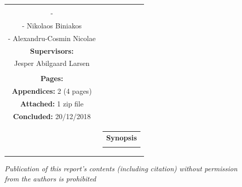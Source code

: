 \begin{nopagebreak}
{\begin{tabular}{cc}
{{\textbf{Participants:}\\
-  \\
- Nikolaos Biniakos\\
- Alexandru-Cosmin Nicolae\\

\textbf{Supervisors:}\\
Jesper Abilgaard Larsen \\ %
}\\


\textbf{Pages:} \\
\textbf{Appendices:} 2 (4 pages)\\
\textbf{Attached:} 1 zip file\\
\textbf{Concluded:} 20/12/2018\\

\vfill } &
\parbox{7cm}{
  \vspace{.15cm}
  \hfill
  \begin{tabular}{l}
  {\textbf{Synopsis}}\bigskip \\
  \fbox{
    \parbox{6.5cm}{\bigskip
     {\vfill{\small 
     \bigskip}}
     }}
   \end{tabular}}
\end{tabular}} %

\textit{\phantom{A}Publication of this report's contents (including citation) without permission\\ \phantom{A}from the authors is prohibited}\\

\end{nopagebreak}
%